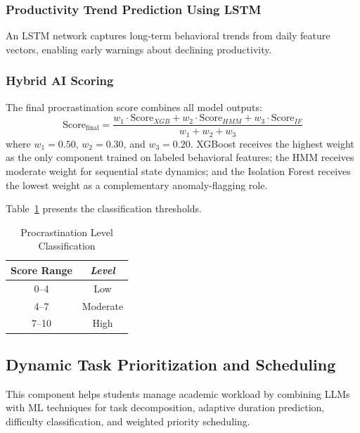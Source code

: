 \documentclass[conference]{IEEEtran}
\begin{document}
\subsubsection{Productivity Trend Prediction Using LSTM}
An LSTM network captures long-term behavioral trends from daily feature vectors, enabling early warnings about declining productivity.

\subsubsection{Hybrid AI Scoring}
The final procrastination score combines all model outputs:
\begin{equation}
\text{Score}_{\text{final}} = \frac{w_1 \cdot \text{Score}_{XGB} + w_2 \cdot \text{Score}_{HMM} + w_3 \cdot \text{Score}_{IF}}{w_1 + w_2 + w_3}
\label{eq_hybrid_score}
\end{equation}
where $w_1 = 0.50$, $w_2 = 0.30$, and $w_3 = 0.20$. XGBoost receives the highest weight as the only component trained on labeled behavioral features; the HMM receives moderate weight for sequential state dynamics; and the Isolation Forest receives the lowest weight as a complementary anomaly-flagging role.

Table~\ref{tab_procrastination_levels} presents the classification thresholds.

\begin{table}[htbp]
\caption{Procrastination Level Classification}
\label{tab_procrastination_levels}
\begin{center}
\begin{tabular}{|c|c|}
\hline
\textbf{Score Range} & \textbf{\textit{Level}} \\
\hline
0--4 & Low \\
\hline
4--7 & Moderate \\
\hline
7--10 & High \\
\hline
\end{tabular}
\end{center}
\end{table}

\subsection{Dynamic Task Prioritization and Scheduling}
This component helps students manage academic workload by combining LLMs with ML techniques for task decomposition, adaptive duration prediction, difficulty classification, and weighted priority scheduling.
\end{document}
